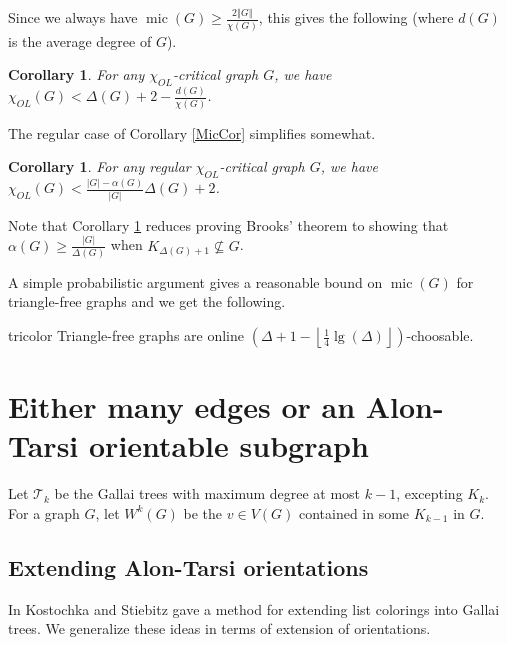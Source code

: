 \documentclass[12pt]{article}
\theoremstyle{plain}
\newtheorem{cor}[thm]{Corollary}
\theoremstyle{definition}
\theoremstyle{remark}
\newcommand{\fancy}[1]{\mathcal{#1}}
\newcommand{\T}{\fancy{T}}
\newcommand{\size}[1]{\left\Vert#1\right\Vert}
\newcommand{\floor}[1]{\left\lfloor#1\right\rfloor}
\newcommand{\parens}[1]{\left( #1 \right)}
\newcommand{\mic}{\operatorname{mic}}
\begin{document}
Since we always have $\mic(G) \ge \frac{2\size{G}}{\chi(G)}$, this gives the following (where $d(G)$ is the average degree of $G$).

\begin{cor}
For any $\chi_{OL}$-critical graph $G$, we have $\chi_{OL}(G) < \Delta(G) + 2 - \frac{d(G)}{\chi(G)}$.
\end{cor}

The regular case of Corollary \ref{MicCor} simplifies somewhat.
\begin{cor}\label{regularizey}
For any regular $\chi_{OL}$-critical graph $G$, we have $\chi_{OL}(G) < \frac{|G| - \alpha(G)}{|G|}\Delta(G) + 2$.
\end{cor}

Note that Corollary \ref{regularizey} reduces proving Brooks' theorem to showing that $\alpha(G) \ge \frac{|G|}{\Delta(G)}$ when $K_{\Delta(G) + 1} \not \subseteq G$.

A simple probabilistic argument gives a reasonable bound on $\mic(G)$ for triangle-free graphs and we get the following.
\begin{repcor}{tricolor}
Triangle-free graphs are online $\parens{\Delta + 1 - \floor{\frac14 \lg(\Delta)}}$-choosable.
\end{repcor}



\section{Either many edges or an Alon-Tarsi orientable subgraph}
Let $\T_k$ be the Gallai trees with maximum degree at most $k-1$, excepting $K_k$. For a graph $G$, let $W^k(G)$ be the $v \in V(G)$ contained in some $K_{k-1}$ in $G$. 

\subsection{Extending Alon-Tarsi orientations}
In \cite{kostochkastiebitzedgesincriticalgraph} Kostochka and Stiebitz gave a method for extending list colorings into Gallai trees. We generalize these ideas in terms of extension of orientations.
\end{document}
